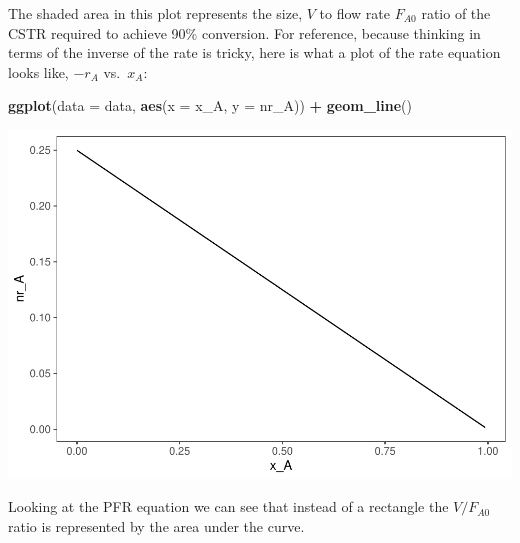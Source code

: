 \documentclass[
]{article}
\newenvironment{Shaded}{\begin{snugshade}}{\end{snugshade}}
\newcommand{\AttributeTok}[1]{\textcolor[rgb]{0.13,0.29,0.53}{#1}}
\newcommand{\FunctionTok}[1]{\textcolor[rgb]{0.13,0.29,0.53}{\textbf{#1}}}
\newcommand{\NormalTok}[1]{#1}
\newcommand{\SpecialCharTok}[1]{\textcolor[rgb]{0.81,0.36,0.00}{\textbf{#1}}}
\begin{document}
The shaded area in this plot represents the size, \(V\) to flow rate \(F_{A0}\) ratio of the CSTR required to achieve 90\% conversion.
For reference, because thinking in terms of the inverse of the rate is tricky, here is what a plot of the rate equation looks like, \(-r_A\) vs.~\(x_A\):

\begin{Shaded}
\begin{Highlighting}[]
\FunctionTok{ggplot}\NormalTok{(}\AttributeTok{data =}\NormalTok{ data, }\FunctionTok{aes}\NormalTok{(}\AttributeTok{x =}\NormalTok{ x\_A, }\AttributeTok{y =}\NormalTok{ nr\_A)) }\SpecialCharTok{+} \FunctionTok{geom\_line}\NormalTok{()}
\end{Highlighting}
\end{Shaded}

\includegraphics{Bioprocess_Engineering_files/figure-latex/unnamed-chunk-16-1.pdf}

Looking at the PFR equation we can see that instead of a rectangle the \(V/F_{A0}\) ratio is represented by the area under the curve.
\end{document}
